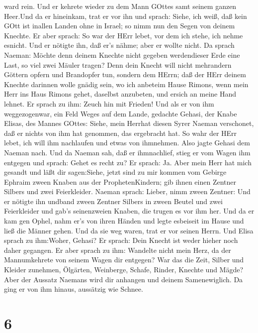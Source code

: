 ward rein.  Und er kehrete wieder zu dem Mann GOttes samt
seinem ganzen Heer.Und da er hineinkam, trat er vor ihn und sprach:
Siehe, ich weiß, daß kein GOtt ist inallen Landen ohne in Israel; so
nimm nun den Segen von deinem Knechte.  Er aber sprach: So
war der HErr lebet, vor dem ich stehe, ich nehme esnicht. Und er nötigte
ihn, daß er's nähme; aber er wollte nicht.  Da sprach
Naeman: Möchte denn deinem Knechte nicht gegeben werdendieser Erde eine
Last, so viel zwei Mäuler tragen? Denn dein Knecht will nicht mehrandern
Göttern opfern und Brandopfer tun, sondern dem HErrn;  daß
der HErr deinem Knechte darinnen wolle gnädig sein, wo ich anbeteim
Hause Rimons, wenn mein Herr ins Haus Rimons gehet, daselbst anzubeten,
und ersich an meine Hand lehnet.  Er sprach zu ihm: Zeuch
hin mit Frieden! Und als er von ihm weggezogenwar, ein Feld Weges auf
dem Lande,  gedachte Gehasi, der Knabe Elisas, des Mannes
GOttes: Siehe, mein Herrhat diesen Syrer Naeman verschonet, daß er
nichts von ihm hat genommen, das ergebracht hat. So wahr der HErr lebet,
ich will ihm nachlaufen und etwas von ihmnehmen.  Also
jagte Gehasi dem Naeman nach. Und da Naeman sah, daß er ihmnachlief,
stieg er vom Wagen ihm entgegen und sprach: Gehet es recht zu?
 Er sprach: Ja. Aber mein Herr hat mich gesandt und läßt
dir sagen:Siehe, jetzt sind zu mir kommen vom Gebirge Ephraim zween
Knaben aus der ProphetenKindern; gib ihnen einen Zentner Silbers und
zwei Feierkleider.  Naeman sprach: Lieber, nimm zween
Zentner: Und er nötigte ihn undband zween Zentner Silbers in zween
Beutel und zwei Feierkleider und gab's seinenzweien Knaben, die trugen
es vor ihm her.  Und da er kam gen Ophel, nahm er's von
ihren Händen und legte esbeiseit im Hause und ließ die Männer gehen.
 Und da sie weg waren, trat er vor seinen Herrn. Und Elisa
sprach zu ihm:Woher, Gehasi? Er sprach: Dein Knecht ist weder hieher
noch daher gegangen.  Er aber sprach zu ihm: Wandelte nicht
mein Herz, da der Mannumkehrete von seinem Wagen dir entgegen? War das
die Zeit, Silber und Kleider zunehmen, Ölgärten, Weinberge, Schafe,
Rinder, Knechte und Mägde?  Aber der Aussatz Naemans wird
dir anhangen und deinem Samenewiglich. Da ging er von ihm hinaus,
aussätzig wie Schnee.

\hypertarget{section-5}{%
\section{6}\label{section-5}}

